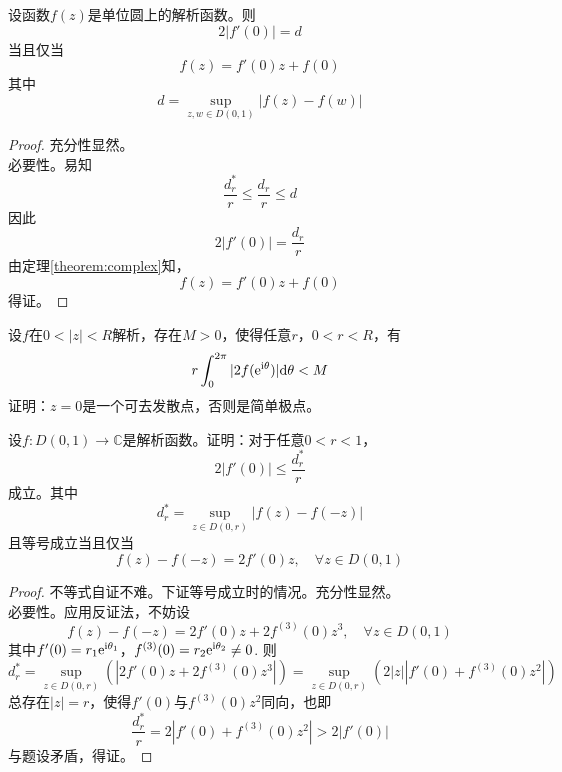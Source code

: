 \begin{theorem}

    设函数$f(z)$是单位圆上的解析函数。则
    $$2|f'(0)| = d$$
    当且仅当
    $$f(z) = f'(0)z + f(0)$$
    其中
    $$d = \sup\limits_{z, w \in D(0, 1)}{|f(z) - f(w)|}$$
    
\end{theorem}

\begin{proof}

    充分性显然。\\
    必要性。易知
    $$\dfrac{d_r^{*}}{r} \leq \dfrac{d_r}{r} \leq d$$
    因此
    $$2|f'(0)| = \dfrac{d_r}{r}$$
    由定理\ref{theorem:complex}知，
    $$f(z) = f'(0)z + f(0)$$
    得证。

\end{proof}

\begin{proposition}
    
    设$f$在$0 < |z| < R$解析，存在$M > 0$，使得任意$r$，$0 < r < R$，有
    $$r \int_{0}^{2 \pi}{|2f(\mathrm{e^{i\theta}})|}\mathrm{d} \theta < M$$
    证明：$z = 0$是一个可去发散点，否则是简单极点。

\end{proposition}

\begin{proposition}

    设$f : D(0, 1) \to \mathbb{C}$是解析函数。证明：对于任意$0 < r < 1$，
    $$2|f'(0)| \leq \dfrac{d_r^{*}}{r}$$
    成立。其中
    $$d_r^{*} = \sup\limits_{z \in D(0, r)}{|f(z) - f(-z)|}$$
    且等号成立当且仅当
    $$f(z) - f(-z) = 2f'(0)z, \quad \forall z \in D(0, 1)$$

\end{proposition}

\begin{proof}

    不等式自证不难。下证等号成立时的情况。充分性显然。\\
    必要性。应用反证法，不妨设
    $$f(z) - f(-z) = 2f'(0)z + 2f^{(3)}(0)z^3, \quad \forall z \in D(0, 1)$$
    其中$f'(0) = r_1\mathrm{e}^{\mathrm{i} \theta_1}$，$f^{(3)}(0) = r_2\mathrm{e}^{\mathrm{i} \theta_2} \neq 0$. 则
    $$d_r^{*} = \sup\limits_{z \in D(0, r)}{(|2f'(0)z + 2f^{(3)}(0)z^3|)} = \sup\limits_{z \in D(0, r)}{(2|z||f'(0) + f^{(3)}(0)z^2|)}$$
    总存在$|z| = r$，使得$f'(0)$与$f^{(3)}(0)z^2$同向，也即
    $$\dfrac{d_r^{*}}{r} = 2|f'(0) + f^{(3)}(0)z^2| > 2|f'(0)|$$
    与题设矛盾，得证。

\end{proof}

